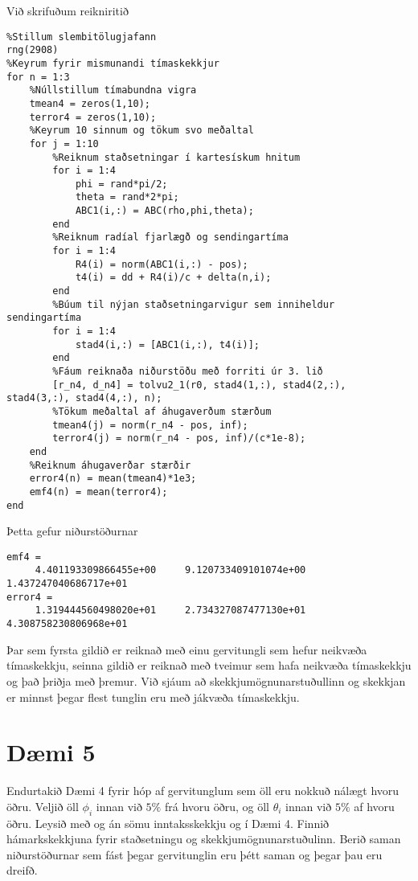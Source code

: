 \documentclass[11pt]{article}
\begin{document}
Við skrifuðum reikniritið

\begin{verbatim}
%Stillum slembitölugjafann
rng(2908)
%Keyrum fyrir mismunandi tímaskekkjur
for n = 1:3
    %Núllstillum tímabundna vigra
    tmean4 = zeros(1,10);
    terror4 = zeros(1,10);
    %Keyrum 10 sinnum og tökum svo meðaltal
    for j = 1:10
        %Reiknum staðsetningar í kartesískum hnitum
        for i = 1:4
            phi = rand*pi/2;
            theta = rand*2*pi;
            ABC1(i,:) = ABC(rho,phi,theta);
        end
        %Reiknum radíal fjarlægð og sendingartíma
        for i = 1:4
            R4(i) = norm(ABC1(i,:) - pos);
            t4(i) = dd + R4(i)/c + delta(n,i);
        end
        %Búum til nýjan staðsetningarvigur sem inniheldur sendingartíma
        for i = 1:4
            stad4(i,:) = [ABC1(i,:), t4(i)];
        end
        %Fáum reiknaða niðurstöðu með forriti úr 3. lið
        [r_n4, d_n4] = tolvu2_1(r0, stad4(1,:), stad4(2,:), stad4(3,:), stad4(4,:), n);
        %Tökum meðaltal af áhugaverðum stærðum
        tmean4(j) = norm(r_n4 - pos, inf);
        terror4(j) = norm(r_n4 - pos, inf)/(c*1e-8);
    end
    %Reiknum áhugaverðar stærðir
    error4(n) = mean(tmean4)*1e3;
    emf4(n) = mean(terror4);
end
\end{verbatim}
Þetta gefur niðurstöðurnar
\begin{verbatim}
emf4 =
     4.401193309866455e+00     9.120733409101074e+00     1.437247040686717e+01
error4 =
     1.319444560498020e+01     2.734327087477130e+01     4.308758230806968e+01
\end{verbatim}
Þar sem fyrsta gildið er reiknað með einu gervitungli sem hefur neikvæða tímaskekkju, seinna gildið er reiknað með tveimur sem hafa neikvæða tímaskekkju og það þriðja með þremur. Við sjáum að skekkjumögnunarstuðullinn og skekkjan er minnst þegar flest tunglin eru með jákvæða tímaskekkju.

\newpage

\section*{Dæmi 5}
Endurtakið Dæmi 4 fyrir hóp af gervitunglum sem öll eru nokkuð nálægt hvoru öðru. Veljið öll $\phi_i$ innan við $5\%$ frá hvoru öðru, og öll $\theta_i$ innan við $5\%$ af hvoru öðru. Leysið með og án sömu inntaksskekkju og í Dæmi 4. Finnið hámarkskekkjuna fyrir staðsetningu og skekkjumögnunarstuðulinn. Berið saman niðurstöðurnar sem fást þegar gervitunglin eru þétt saman og þegar þau eru dreifð. 
\end{document}
